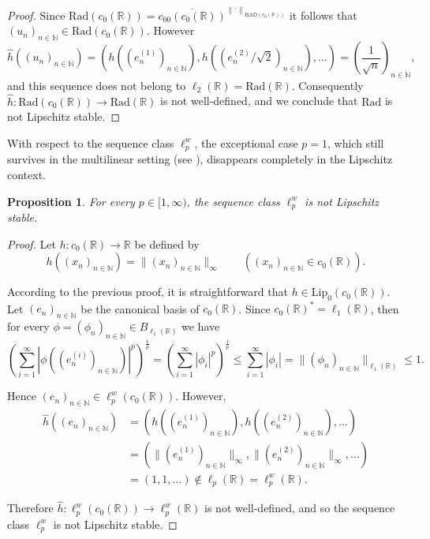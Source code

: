 \documentclass[12pt]{amsart}
\newtheorem{proposition}[theorem]{Proposition}
\def\R{\mathbb{R}}
\def\N{\mathbb{N}}
\def\Lip{\mathrm{Lip}_0}
\def\Rad{\mathrm{Rad}}
\def\RAD{\mathrm{RAD}}
\begin{document}
\begin{proof}
	Since $\Rad(c_0(\R))= \overline{c_{00}(c_0(\R))}^{\left\|\cdot\right\|_{\RAD(c_0(\R))}}$ it follows that $(u_n)_{n\in\N} \in \Rad(c_0(\R))$. However 
	$$
	\hat{h}((u_n)_{n\in\N}) = \left( h((e_n^{(1)})_{n\in\N}), h\left(\left(e_n^{(2)}/\sqrt{2}\right)_{n\in\N}\right),\ldots \right) = \left( \frac{1}{\sqrt{n}}\right)_{n\in\N},
	$$
	and this sequence does not belong to $\ell_2(\R)=\Rad(\R)$. Consequently $\hat{h}:\Rad(c_0(\R)) \to \Rad(\R)$ is not well-defined, and we conclude that $\Rad$ is not Lipschitz stable.
\end{proof}

With respect to the sequence class $\ell_p^w$, the exceptional case $p=1$, which still survives in the multilinear setting (see \cite[Theorem 4.3]{BotCam-17}), disappears completely in the Lipschitz context.

\begin{proposition}\label{Prop new}
	For every $p \in [1,\infty)$, the sequence class $\ell_p^w$ is not Lipschitz stable.
\end{proposition}

\begin{proof}
	Let $h: c_0(\R) \to \R$ be defined by
	$$
	h((x_n)_{n\in\N}) = \|(x_n)_{n\in\N}\|_\infty \qquad ((x_n)_{n\in\N}\in c_0(\R)).
	$$

	According to the previous proof, it is straightforward that $h\in\Lip(c_0(\R))$. Let $(e_n)_{n\in\N}$ be the canonical basis of $c_0(\R)$. Since $c_0(\R)^* = \ell_1(\R)$, then for every $\phi = (\phi_n)_{n\in\N} \in B_{\ell_1(\R)}$ we have
	$$
	\left( \sum_{i=1}^\infty |\phi((e^{(i)}_n)_{n\in\N})|^p \right)^{\frac{1}{p}} = \left( \sum_{i=1}^{\infty} |\phi_i|^p \right)^{\frac{1}{p}} \leq \sum_{i=1}^{\infty} |\phi_i| = \|(\phi_n)_{n\in\N}\|_{\ell_1(\R)} \leq 1.
	$$

	Hence $(e_n)_{n\in\N} \in \ell_p^w(c_0(\R))$. However,
	\begin{align*}
	\hat{h}((e_n)_{n\in\N}) &= (h((e^{(1)}_n)_{n\in\N}),h((e^{(2)}_n)_{n\in\N}),\ldots)\\ 
	&= (\|(e_n^{(1)})_{n\in\N}\|_\infty,\|(e_n^{(2)})_{n\in\N}\|_\infty, \ldots)\\
	&= (1,1,\ldots) \notin \ell_p(\R) = \ell_p^w(\R).
	\end{align*}

	Therefore $\hat{h}: \ell_p^w(c_0(\R)) \to \ell_p^w(\R)$ is not well-defined, and so the sequence class $\ell_p^w$ is not Lipschitz stable.
\end{proof}
\end{document}
